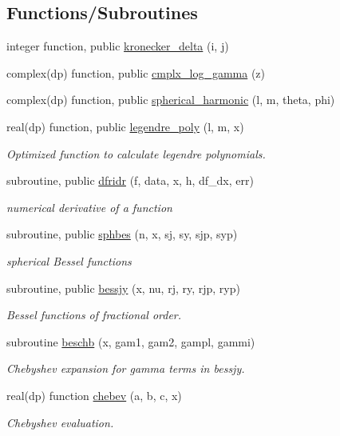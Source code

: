 \subsection*{Functions/\+Subroutines}
\begin{DoxyCompactItemize}
\item 
integer function, public \hyperlink{namespacenum__recipes_a866cf4a4cf4693c7f6f56dd5ecbaf0c5}{kronecker\+\_\+delta} (i, j)
\item 
complex(dp) function, public \hyperlink{namespacenum__recipes_a024b1f51e277f9765e4ea2160090bc8c}{cmplx\+\_\+log\+\_\+gamma} (z)
\item 
complex(dp) function, public \hyperlink{namespacenum__recipes_ac4a87c3daeeb45285208250fd3f27d4a}{spherical\+\_\+harmonic} (l, m, theta, phi)
\item 
real(dp) function, public \hyperlink{namespacenum__recipes_abb39707356349ecadb66e01014f12520}{legendre\+\_\+poly} (l, m, x)
\begin{DoxyCompactList}\small\item\em Optimized function to calculate legendre polynomials. \end{DoxyCompactList}\item 
subroutine, public \hyperlink{namespacenum__recipes_a35e9f30262aeb7588bf205c2b018abd4}{dfridr} (f, data, x, h, df\+\_\+dx, err)
\begin{DoxyCompactList}\small\item\em numerical derivative of a function \end{DoxyCompactList}\item 
subroutine, public \hyperlink{namespacenum__recipes_a1dfc128c6203c9e7bede17caa5fbb828}{sphbes} (n, x, sj, sy, sjp, syp)
\begin{DoxyCompactList}\small\item\em spherical Bessel functions \end{DoxyCompactList}\item 
subroutine, public \hyperlink{namespacenum__recipes_ad8ad468d2545789939deec75dd273d93}{bessjy} (x, nu, rj, ry, rjp, ryp)
\begin{DoxyCompactList}\small\item\em Bessel functions of fractional order. \end{DoxyCompactList}\item 
subroutine \hyperlink{namespacenum__recipes_a361c889af1a90696af2e7b68b7ea8fd7}{beschb} (x, gam1, gam2, gampl, gammi)
\begin{DoxyCompactList}\small\item\em Chebyshev expansion for gamma terms in bessjy. \end{DoxyCompactList}\item 
real(dp) function \hyperlink{namespacenum__recipes_a798cfb76aca4655f8cc33fcfa19683d7}{chebev} (a, b, c, x)
\begin{DoxyCompactList}\small\item\em Chebyshev evaluation. \end{DoxyCompactList}\end{DoxyCompactItemize}
